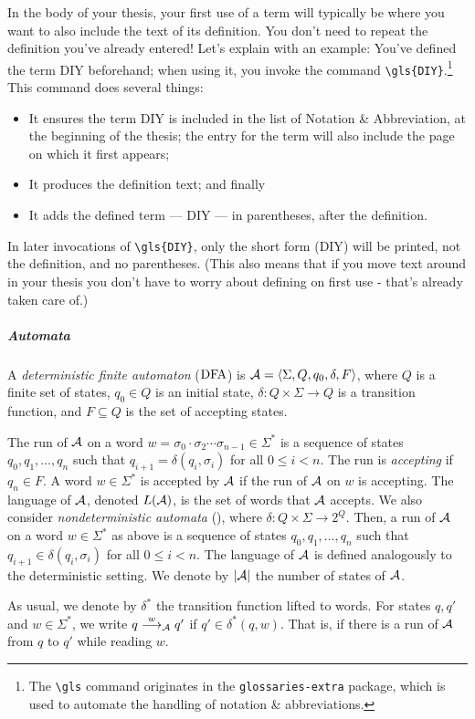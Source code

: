 In the body of your thesis, your first use of a term will typically be where you want to also include the text of its definition. You don't need to repeat the definition you've already entered! Let's explain with an example: You've defined the term \gls{DIY} beforehand; when using it, you invoke the command \verb|\gls{DIY}|.\footnote{The 
\texttt{\textbackslash{}gls} command originates in the \texttt{glossaries-extra} package, which is used to automate the handling of notation \& abbreviations.} This command does several things:
\begin{itemize}
	\item It ensures the term \gls{DIY} is included in the list of Notation \& Abbreviation, at the beginning of the thesis; the entry for the term will also include the page on which it first appears;
	\item It produces the definition text; and finally
	\item It adds the defined term --- \gls{DIY} --- in parentheses, after the definition.
\end{itemize}
In later invocations of \verb|\gls{DIY}|, only the short form (\gls{DIY}) will be printed, not the definition, and no parentheses. (This also means that if you move text around in your thesis you don't have to worry about defining on first use - that's already taken care of.) 

\subparagraph*{Automata}
A \emph{deterministic finite automaton} ($\mbox{\rm DFA}$) is $\mathcal{A}=\left< \Sigma,Q,q_0,\delta,F\right>$, where $Q$ is a finite set of states, $q_0 \in Q$ is an initial state, $\delta: Q\times \Sigma \to Q$ is a transition function, and $F\subseteq Q$ is the set of accepting states. 

The run of $\mathcal{A}$ on a word $w=\sigma_0 \cdot \sigma_2 \cdots \sigma_{n-1}\in \Sigma^*$ is a sequence of states $q_0,q_1,\ldots,q_n$ such that $q_{i+1} = \delta(q_i,\sigma_{i})$ for all $0\le i<n$. 
The run is \emph{accepting} if $q_n\in F$. A word $w \in \Sigma^*$ is accepted by $\mathcal{A}$ if the run of $\mathcal{A}$ on $w$ is accepting. The language of $\mathcal{A}$, denoted $L(\mathcal{A})$, is the set of words that $\mathcal{A}$ accepts. 
We also consider \emph{nondeterministic automata} (\NFA), where $\delta:Q\times \Sigma\to 2^Q$. Then, a run of $\mathcal{A}$ on a word $w\in \Sigma^*$ as above is a sequence of states $q_0,q_1,\ldots,q_n$ such that $q_{i+1} \in \delta(q_i,\sigma_{i})$ for all $0\le i<n$. The language of $\mathcal{A}$ is defined analogously to the deterministic setting.
We denote by $|\mathcal{A}|$ the number of states of $\mathcal{A}$.

As usual, we denote by $\delta^*$ the transition function lifted to words.
For states $q,q'$ and $w\in \Sigma^*$, we write $q\stackrel{w}{\longrightarrow}_{\mathcal{A}}q'$ if $q'\in \delta^*(q,w)$. That is, if there is a run of $\mathcal{A}$ from $q$ to $q'$ while reading $w$.

